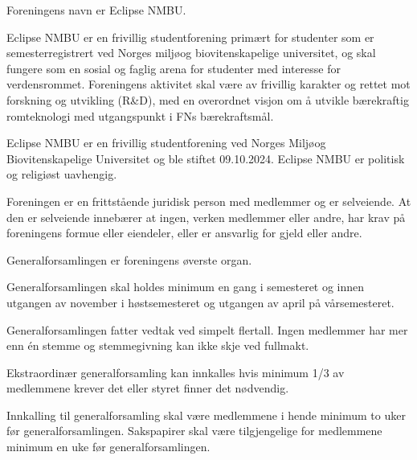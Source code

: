\documentclass{rapport}
\date{April 15, 2026}
\begin{document}
\makecoverpage
\tableofcontents
\reportmainmatter


Foreningens navn er Eclipse NMBU.


Eclipse NMBU er en frivillig studentforening primært for studenter som er
semesterregistrert ved Norges miljøog biovitenskapelige universitet, og skal
fungere som en sosial og faglig arena for studenter med interesse for
verdensrommet. Foreningens aktivitet skal være av frivillig karakter og rettet mot
forskning og utvikling (R\&D), med en overordnet visjon om å utvikle bærekraftig
romteknologi med utgangspunkt i FNs bærekraftsmål.


Eclipse NMBU er en frivillig studentforening ved Norges Miljøog Biovitenskapelige
Universitet og ble stiftet 09.10.2024. Eclipse NMBU er politisk og religiøst uavhengig.

Foreningen er en frittstående juridisk person med medlemmer og er selveiende. At den er
selveiende innebærer at ingen, verken medlemmer eller andre, har krav på foreningens
formue eller eiendeler, eller er ansvarlig for gjeld eller andre.


Generalforsamlingen er foreningens øverste organ.

Generalforsamlingen skal holdes minimum en gang i semesteret og innen utgangen av
november i høstsemesteret og utgangen av april på vårsemesteret.

Generalforsamlingen fatter vedtak ved simpelt flertall. Ingen medlemmer har mer enn én
stemme og stemmegivning kan ikke skje ved fullmakt.

Ekstraordinær generalforsamling kan innkalles hvis minimum 1/3 av medlemmene krever
det eller styret finner det nødvendig.

Innkalling til generalforsamling skal være medlemmene i hende minimum to uker før
generalforsamlingen. Sakspapirer skal være tilgjengelige for medlemmene minimum en uke
før generalforsamlingen.
\end{document}
